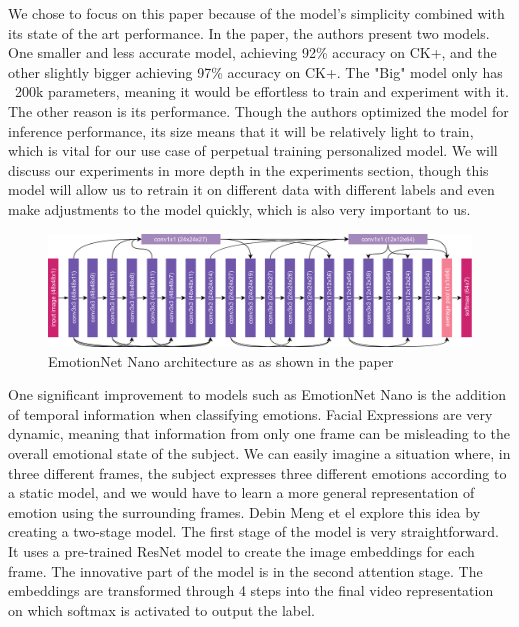 \documentclass[../main.tex]{subfiles}
\begin{document}
We chose to focus on this paper because of the model's simplicity combined with its state of the art performance. In the paper,
the authors present two models. One smaller and less accurate model, achieving 92\% accuracy on CK+,
and the other slightly bigger achieving 97\% accuracy on CK+. The "Big" model only has ~200k parameters, meaning it would be effortless to
train and experiment with it. The other reason is its performance. Though the authors optimized the model for inference performance,
its size means that it will be relatively light to train, which is vital for our use case of perpetual training personalized model.
We will discuss our experiments in more depth in the experiments section, though this model will allow us to retrain it on different data
with different labels and even make adjustments to the model quickly, which is also very important to us.
\par

\begin{figure}[htp]
    \centering
    \includegraphics[width=12cm]{figures/emotionnet_nano.png}   
    \caption{EmotionNet Nano architecture as as shown in the paper \cite{emotionnet-nano}}
    \label{fig:emotionnet_nano} 
\end{figure}

One significant improvement to models such as EmotionNet Nano is the addition of temporal information when classifying emotions.
Facial Expressions are very dynamic, meaning that information from only one frame can be misleading to the overall emotional state of the subject.
We can easily imagine a situation where, in three different frames, the subject expresses three different emotions according to a static model,
and we would have to learn a more general representation of emotion using the surrounding frames.
Debin Meng et el \cite{fan} explore this idea by creating a two-stage model. The first stage of the model is very straightforward.
It uses a pre-trained ResNet model to create the image embeddings for each frame. The innovative part of the model is in the second attention stage.
The embeddings are transformed through 4 steps into the final video representation on which softmax is activated to output the label.
\end{document}
